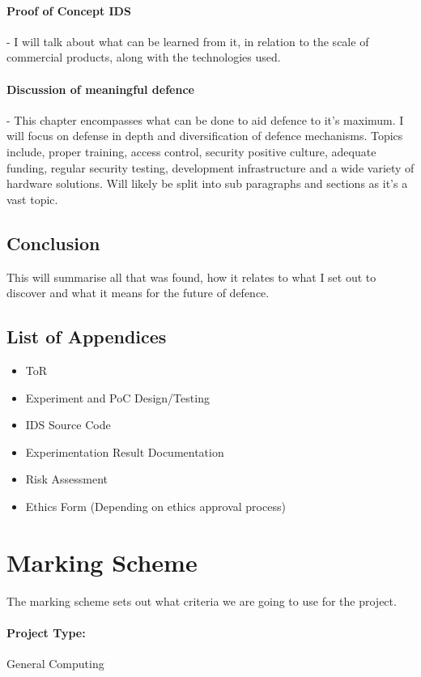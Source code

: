 \paragraph{Proof of Concept IDS} - I will talk about what can be learned from it, in relation to the scale of commercial products, along with the technologies used.


\paragraph{Discussion of meaningful defence} - This chapter encompasses what can be done to aid defence to it's maximum. I will focus on defense in depth and diversification of defence mechanisms. 
Topics include, proper training, access control, security positive culture, adequate funding, regular security testing, development infrastructure and a wide variety of hardware solutions. 
Will likely be split into sub paragraphs and sections as it's a vast topic.

\subsection{Conclusion} This will summarise all that was found, how it relates to what I set out to discover and what it means for the future of defence. 


\subsection{List of Appendices}
\begin{itemize}
	\item ToR
	\item Experiment and PoC Design/Testing
	\item IDS Source Code
	\item Experimentation Result Documentation
	\item Risk Assessment
	\item Ethics Form (Depending on ethics approval process)
\end{itemize}

\section{Marking Scheme}
The marking scheme sets out what criteria we are going to use for the project.

\paragraph{Project Type:} General Computing

